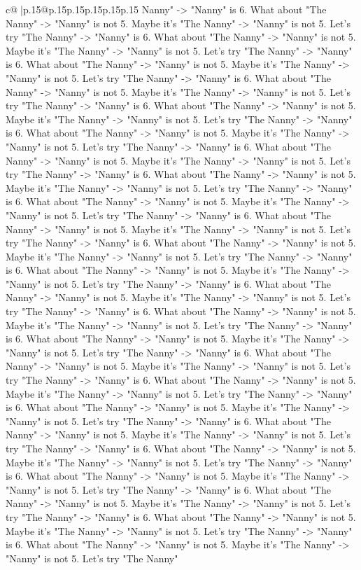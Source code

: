 \documentclass{article}
\begin{document}
{\begin{supertabular}{c@{$\;$}|p{.15\linewidth}@{}p{.15\linewidth}p{.15\linewidth}p{.15\linewidth}p{.15\linewidth}p{.15\linewidth}}
{{{Nanny" {-}> "Nanny" is 6. What about "The Nanny" {-}> "Nanny" is not 5. Maybe it's "The Nanny" {-}> "Nanny" is not 5. Let's try "The Nanny" {-}> "Nanny" is 6. What about "The Nanny" {-}> "Nanny" is not 5. Maybe it's "The Nanny" {-}> "Nanny" is not 5. Let's try "The Nanny" {-}> "Nanny" is 6. What about "The Nanny" {-}> "Nanny" is not 5. Maybe it's "The Nanny" {-}> "Nanny" is not 5. Let's try "The Nanny" {-}> "Nanny" is 6. What about "The Nanny" {-}> "Nanny" is not 5. Maybe it's "The Nanny" {-}> "Nanny" is not 5. Let's try "The Nanny" {-}> "Nanny" is 6. What about "The Nanny" {-}> "Nanny" is not 5. Maybe it's "The Nanny" {-}> "Nanny" is not 5. Let's try "The Nanny" {-}> "Nanny" is 6. What about "The Nanny" {-}> "Nanny" is not 5. Maybe it's "The Nanny" {-}> "Nanny" is not 5. Let's try "The Nanny" {-}> "Nanny" is 6. What about "The Nanny" {-}> "Nanny" is not 5. Maybe it's "The Nanny" {-}> "Nanny" is not 5. Let's try "The Nanny" {-}> "Nanny" is 6. What about "The Nanny" {-}> "Nanny" is not 5. Maybe it's "The Nanny" {-}> "Nanny" is not 5. Let's try "The Nanny" {-}> "Nanny" is 6. What about "The Nanny" {-}> "Nanny" is not 5. Maybe it's "The Nanny" {-}> "Nanny" is not 5. Let's try "The Nanny" {-}> "Nanny" is 6. What about "The Nanny" {-}> "Nanny" is not 5. Maybe it's "The Nanny" {-}> "Nanny" is not 5. Let's try "The Nanny" {-}> "Nanny" is 6. What about "The Nanny" {-}> "Nanny" is not 5. Maybe it's "The Nanny" {-}> "Nanny" is not 5. Let's try "The Nanny" {-}> "Nanny" is 6. What about "The Nanny" {-}> "Nanny" is not 5. Maybe it's "The Nanny" {-}> "Nanny" is not 5. Let's try "The Nanny" {-}> "Nanny" is 6. What about "The Nanny" {-}> "Nanny" is not 5. Maybe it's "The Nanny" {-}> "Nanny" is not 5. Let's try "The Nanny" {-}> "Nanny" is 6. What about "The Nanny" {-}> "Nanny" is not 5. Maybe it's "The Nanny" {-}> "Nanny" is not 5. Let's try "The Nanny" {-}> "Nanny" is 6. What about "The Nanny" {-}> "Nanny" is not 5. Maybe it's "The Nanny" {-}> "Nanny" is not 5. Let's try "The Nanny" {-}> "Nanny" is 6. What about "The Nanny" {-}> "Nanny" is not 5. Maybe it's "The Nanny" {-}> "Nanny" is not 5. Let's try "The Nanny" {-}> "Nanny" is 6. What about "The Nanny" {-}> "Nanny" is not 5. Maybe it's "The Nanny" {-}> "Nanny" is not 5. Let's try "The Nanny" {-}> "Nanny" is 6. What about "The Nanny" {-}> "Nanny" is not 5. Maybe it's "The Nanny" {-}> "Nanny" is not 5. Let's try "The Nanny" {-}> "Nanny" is 6. What about "The Nanny" {-}> "Nanny" is not 5. Maybe it's "The Nanny" {-}> "Nanny" is not 5. Let's try "The Nanny" {-}> "Nanny" is 6. What about "The Nanny" {-}> "Nanny" is not 5. Maybe it's "The Nanny" {-}> "Nanny" is not 5. Let's try "The Nanny" {-}> "Nanny" is 6. What about "The Nanny" {-}> "Nanny" is not 5. Maybe it's "The Nanny" {-}> "Nanny" is not 5. Let's try "The Nanny" {-}> "Nanny" is 6. What about "The Nanny" {-}> "Nanny" is not 5. Maybe it's "The Nanny" {-}> "Nanny" is not 5. Let's try "The Nanny" {-}> "Nanny" is 6. What about "The Nanny" {-}> "Nanny" is not 5. Maybe it's "The Nanny" {-}> "Nanny" is not 5. Let's try "The Nanny" {-}> "Nanny" is 6. What about "The Nanny" {-}> "Nanny" is not 5. Maybe it's "The Nanny" {-}> "Nanny" is not 5. Let's try "The Nanny" }}}
\end{supertabular}}
\end{document}
